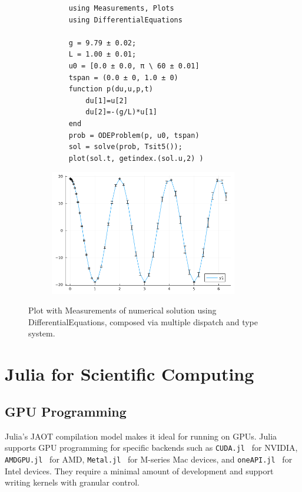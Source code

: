 \documentclass{webofc}
\begin{document}
\begin{figure}[!ht]
\begin{subfigure}[t!]{0.5\textwidth}
    \begin{verbatim}
    using Measurements, Plots
    using DifferentialEquations

    g = 9.79 ± 0.02; 
    L = 1.00 ± 0.01;
    u0 = [0.0 ± 0.0, π \ 60 ± 0.01]
    tspan = (0.0 ± 0, 1.0 ± 0) 
    function p(du,u,p,t)
        du[1]=u[2]
        du[2]=-(g/L)*u[1]
    end
    prob = ODEProblem(p, u0, tspan) 
    sol = solve(prob, Tsit5());
    plot(sol.t, getindex.(sol.u,2) ) 
    \end{verbatim}
\end{subfigure}
\begin{subfigure}[t!]{0.5\textwidth}
    \includegraphics[width=0.9\textwidth]{errorbars.png}
\end{subfigure}
    \caption{Plot with Measurements of numerical solution using DifferentialEquations, 
    composed via multiple dispatch and type system.}
    \label{code:plotmeasure}
    \end{figure}


\section{Julia for Scientific Computing}
\label{sec:juliascicomp}

    
\subsection{GPU Programming}
\label{sec:gpuprog}

Julia's JAOT compilation model makes it ideal for running on GPUs. Julia
supports GPU programming for specific backends such as
\texttt{CUDA.jl}~\cite{besard2018juliagpu} for NVIDIA,
\texttt{AMDGPU.jl}~\cite{julian_samaroo_2025_14826765} for AMD,
\texttt{Metal.jl}~\cite{Besard_Metal_jl_2022} for M-series Mac devices, and \texttt{oneAPI.jl}~\cite{Besard_oneAPI_jl_2022} for Intel devices.
They require a minimal amount of development and support writing kernels with granular control.
\end{document}
